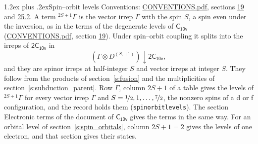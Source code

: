 \documentclass[10pt,a4paper]{article}
\makeatletter
\renewcommand\section{\@startsection{section}{1}{\z@}{-3ex plus -1ex minus -.2ex}%
  {1.2ex plus .2ex}{\normalfont\large\sffamily\bfseries\color{parttitle}}}
\numberwithin{equation}{section}
\newcommand{\grp}[1]{\mathsf{#1}}
\newcommand{\restr}[2]{#1\!\downarrow#2}
\newcommand{\irrJp}[2]{D^{(#1,#2)}}
\newcommand{\irrprod}{\otimes}
\newcommand{\term}[2]{{}^{#1}#2}
\makeatother
\begin{document}
\section{Spin--orbit levels}\label{s:spin_orbit}
Conventions: \href{../../CONVENTIONS.pdf}{CONVENTIONS.pdf}, sections \href{../../../rotation/CONVENTIONS.pdf\#conv.19}{19} and \href{../../CONVENTIONS.pdf\#conv.25.2}{25.2}.
\leavevmode\label{n:local.spin}\label{n:symbol.term}A term $\term{2S+1}{\Gamma}$ is the vector irrep $\Gamma$ with the spin $S$, a spin even under the inversion, as in the terms of the degenerate levels of \href{../../../rotation/data/pdf/C10v.pdf}{$\grp{C_{10v}}$} (\href{../../CONVENTIONS.pdf}{CONVENTIONS.pdf}, section \href{../../../rotation/CONVENTIONS.pdf\#conv.19}{19}). Under spin--orbit coupling it splits into the irreps of $\grp{2C_{10v}}$ in
\begin{equation}\label{e:spinorbit}\restr{(\Gamma \irrprod \irrJp{S}{+1})}{\grp{2C_{10v}}},\end{equation}
and they are spinor irreps at half-integer $S$ and vector irreps at integer $S$. They follow from the products of section~\ref{s:fusion} and the multiplicities of section~\ref{s:subduction_parent}. Row $\Gamma$, column $2S + 1$ of a table gives the levels of $\term{2S+1}{\Gamma}$ for every vector irrep $\Gamma$ and $S = \nicefrac{1}{2}, 1, \dots, \nicefrac{7}{2}$, the nonzero spins of a d or f configuration, and the record holds them (\texttt{spinorbitlevels}). The section Electronic terms of the document of \href{../../../rotation/data/pdf/C10v.pdf}{$\grp{C_{10v}}$} gives the terms in the same way. For an orbital level of section~\ref{s:spin_orbitals}, column $2S + 1 = 2$ gives the levels of one electron, and that section gives their states.
\end{document}
